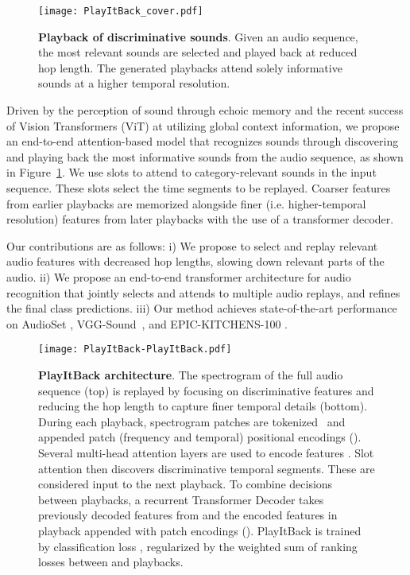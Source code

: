 \documentclass{article}
\begin{document}
\begin{figure}[ht]
    \centering
    \texttt{[image: PlayItBack\_cover.pdf]}
    \caption{\textbf{Playback of discriminative sounds}. Given an audio sequence, the most relevant sounds are selected and played back at reduced hop length. The generated playbacks attend solely informative sounds at a higher temporal resolution.}
    \vspace*{-12pt}
    \label{fig:cover}
\end{figure}

Driven by the perception of sound through echoic memory and the recent success of Vision Transformers (ViT) \cite{dosovitskiy2020image} at utilizing global context information, we propose an end-to-end attention-based model that recognizes sounds through discovering and playing back the most informative sounds from the audio sequence, as shown in Figure~\ref{fig:cover}. We use slots \cite{locatello2020object}
to attend to category-relevant sounds in the input sequence.
These slots select the time segments to be replayed. Coarser features from earlier playbacks are memorized alongside finer (i.e. higher-temporal resolution) features from later playbacks with the use of a transformer decoder.

Our contributions are as follows: i) We propose to select and replay relevant audio features with decreased hop lengths, slowing down relevant parts of the audio. ii) We propose an end-to-end transformer architecture for audio recognition that jointly selects and attends to multiple audio replays, and refines the final class predictions. iii) Our method achieves state-of-the-art performance on AudioSet \cite{gemmeke2017audio}, VGG-Sound~\cite{chen2020vggsound}, and EPIC-KITCHENS-100 \cite{damen2022rescaling}.

\begin{figure*}[ht]
\centering
\texttt{[image: PlayItBack-PlayItBack.pdf]}
\caption{\textbf{PlayItBack architecture}. 
The spectrogram of the full audio sequence (top) is replayed by focusing on discriminative features and reducing the hop length to capture finer temporal details (bottom).
During each playback, spectrogram patches are tokenized~ and appended patch (frequency and temporal) positional encodings (). Several multi-head attention layers are used to encode features . Slot attention  then discovers discriminative temporal segments. 
These are considered input to the next playback.
To combine decisions between playbacks, a recurrent Transformer Decoder  takes previously decoded features from  and the encoded features in  playback appended with patch encodings (). PlayItBack is trained by classification loss , regularized by the weighted sum of ranking losses  between  and  playbacks.}
\vspace*{-10pt}
\label{fig:playitback}
\end{figure*}
\end{document}
